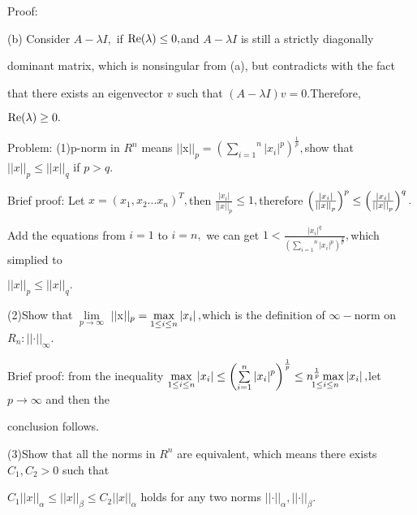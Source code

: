 \documentclass{article}
\begin{document}

Proof:

(b) Consider $A-\lambda I,$ if $\mathop{\rm Re}(\lambda )\leq 0,$and $A-\lambda I$
is still a strictly diagonally

dominant matrix, which is nonsingular from (a), but contradicts with the fact

that there exists an eigenvector $v$ such that $\left( A-\lambda I\right)
v=0.$Therefore,

$\mathop{\rm Re}(\lambda )\geq 0.$

Problem: (1)p-norm in $R^{n}$ means $||$x$||_{p}=\left( \overset{n}{\underset%
{i=1}{\sum }}\left\vert x_{i}\right\vert ^{p}\right) ^{\frac{1}{p}}, $show
that $||x||_{p}\leq ||x||_{q}$ if $p>q.$

Brief proof: Let $x=(x_{1},x_{2}...x_{n})^{T},$then $\frac{\left\vert
x_{i}\right\vert }{\left\vert \left\vert x\right\vert \right\vert _{p}}\leq
1,$therefore $\left( \frac{\left\vert x_{i}\right\vert }{\left\vert
\left\vert x\right\vert \right\vert _{p}}\right) ^{p}\leq \left( \frac{%
\left\vert x_{i}\right\vert }{\left\vert \left\vert x\right\vert \right\vert
_{p}}\right) ^{q}.$

Add the equations from $i=1$ to $i=n,$ we can get $1<\frac{\left\vert
x_{i}\right\vert ^{q}}{\left( \overset{n}{\underset{i=1}{\sum }}\left\vert
x_{i}\right\vert ^{p}\right) ^{\frac{q}{p}}},$which simplied to

$||x||_{p}\leq ||x||_{q}.$

(2)Show that $\underset{p\rightarrow \infty }{\lim }$ $||$x$||_{p}=\underset{%
1\leq i\leq n}{\max }\left\vert x_{i}\right\vert ,$which is the definition
of $\infty -$norm on $R_{n}:\left\vert \left\vert \cdot \right\vert
\right\vert _{\infty }$.

Brief proof: from the inequality $\underset{1\leq i\leq n}{\max }\left\vert
x_{i}\right\vert \leq \left( \overset{n}{\underset{i=1}{\sum }}\left\vert
x_{i}\right\vert ^{p}\right) ^{\frac{1}{p}}\leq \underset{1\leq i\leq n}{n^{%
\frac{1}{p}}\max }\left\vert x_{i}\right\vert ,$let $p\rightarrow \infty $
and then the

conclusion follows.

(3)Show that all the norms in $R^{n}$ are equivalent, which means there
exists $C_{1},C_{2}>0$ such that

$C_{1}\left\vert \left\vert x\right\vert \right\vert _{\alpha }\leq
||x||_{\beta }\leq C_{2}\left\vert \left\vert x\right\vert \right\vert
_{\alpha }$ holds for any two norms $\left\vert \left\vert \cdot \right\vert
\right\vert _{\alpha },\left\vert \left\vert \cdot \right\vert \right\vert
_{\beta }.$
\end{document}
